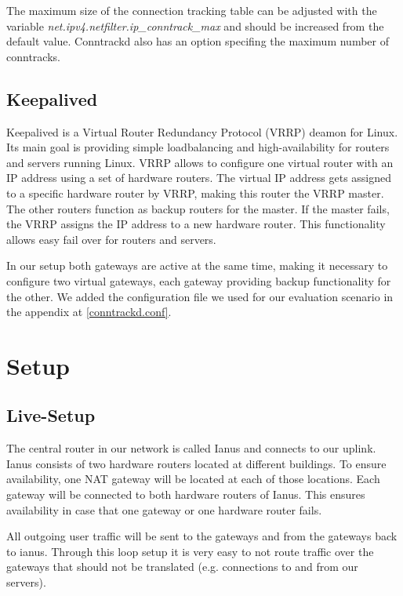\documentclass{report}
\begin{document}
The maximum size of the connection tracking table can be adjusted with
the variable \linebreak \textit{net.ipv4.netfilter.ip\_conntrack\_max} and should be
increased from the default value. Conntrackd also has an option specifing
the maximum number of conntracks.

\section{Keepalived}\label{keepalived}

Keepalived\cite{keepalived} is a Virtual Router Redundancy Protocol (VRRP)\cite{vrrp} deamon
for Linux. Its main goal is providing simple loadbalancing and
high-availability for routers and servers running Linux. VRRP allows to
configure one virtual router with an IP address using a set of hardware
routers. The virtual IP address gets assigned to a specific hardware router by
VRRP, making this router the VRRP master. The other routers
function as backup routers for the master. If the master fails, the VRRP
assigns the IP address to a new hardware router. This functionality allows easy
fail over for routers and servers.

In our setup both gateways are active at the same time, making it
necessary to configure two virtual gateways, each gateway
providing backup functionality for the other. We added the configuration file
we used for our evaluation scenario in the appendix at \ref{conntrackd.conf}.


\chapter{Setup}\label{setup}

\section{Live-Setup}\label{live-setup}

The central router in our network is called Ianus and connects to
our uplink. Ianus consists of two hardware routers located at different
buildings. To ensure availability, one NAT gateway will be located at
each of those locations. Each gateway will be connected to both hardware
routers of Ianus. This ensures availability in case that one gateway or
one hardware router fails.

All outgoing user traffic will be sent to the gateways and from the
gateways back to ianus. Through this loop setup it is very easy to not
route traffic over the gateways that should not be translated (e.g.
connections to and from our servers).
\end{document}
